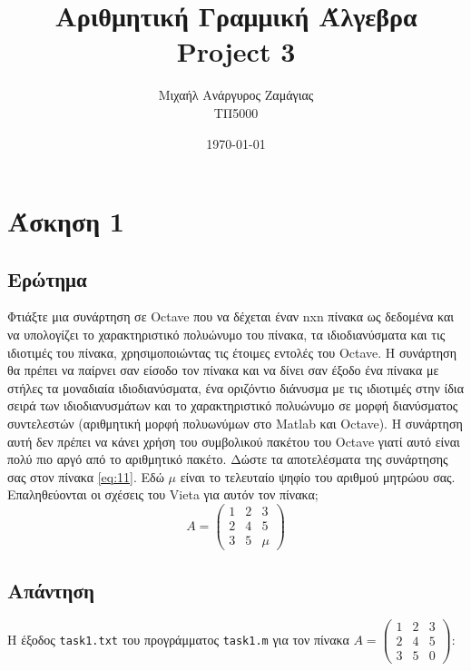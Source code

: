 \documentclass[12pt, fleqn, leqno]{extreport}
\begin{document}
\title{Αριθμητική Γραμμική Άλγεβρα\\Project 3}
\author{Μιχαήλ Ανάργυρος Ζαμάγιας\\ΤΠ5000}
\date{\today}
\maketitle
\newpage

\tableofcontents

\chapter{Άσκηση 1}

\section{Ερώτημα}
Φτιάξτε μια συνάρτηση σε Octave που να δέχεται έναν nxn πίνακα ως δεδομένα και να υπολογίζει το χαρακτηριστικό πολυώνυμο του πίνακα, τα ιδιοδιανύσματα και τις ιδιοτιμές του πίνακα, χρησιμοποιώντας τις έτοιμες εντολές του Octave. Η συνάρτηση θα πρέπει να παίρνει σαν είσοδο τον πίνακα και να δίνει σαν έξοδο ένα πίνακα με στήλες τα μοναδιαία ιδιοδιανύσματα, ένα οριζόντιο διάνυσμα με τις ιδιοτιμές στην ίδια σειρά των ιδιοδιανυσμάτων και το χαρακτηριστικό πολυώνυμο σε μορφή διανύσματος συντελεστών (αριθμητική μορφή πολυωνύμων στο Matlab και Octave). Η συνάρτηση αυτή δεν πρέπει να κάνει χρήση του συμβολικού πακέτου του Octave γιατί αυτό είναι πολύ πιο αργό από το αριθμητικό πακέτο. Δώστε τα αποτελέσματα της συνάρτησης σας στον πίνακα \eqref{eq:11}. Εδώ $\mu$ είναι το τελευταίο ψηφίο του αριθμού μητρώου σας. Επαληθεύονται οι σχέσεις του Vieta για αυτόν τον πίνακα;
\begin{equation}%
    A = \begin{pmatrix}
        1 & 2 & 3   \\
        2 & 4 & 5   \\
        3 & 5 & \mu
    \end{pmatrix}\label{eq:11}
\end{equation}

\newpage
\section{Απάντηση}

Η έξοδος \lstinline[language={}]{task1.txt} του προγράμματος \lstinline[language={}]{task1.m} για τον πίνακα $ A = \begin{pmatrix}
        1 & 2 & 3 \\
        2 & 4 & 5 \\
        3 & 5 & 0
    \end{pmatrix} $:

\end{document}
